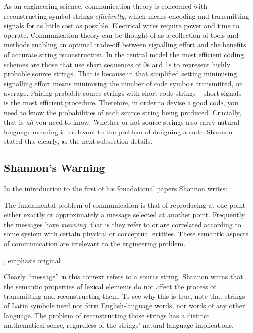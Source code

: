 \documentclass[12pt]{article}
\begin{document}
As an engineering science, communication theory is concerned with reconstructing symbol strings \textit{efficiently}, which means encoding and transmitting signals for as little cost as possible.
Electrical wires require power and time to operate.
Communication theory can be thought of as a collection of tools and methods enabling an optimal trade-off between signalling effort and the benefits of accurate string reconstruction.
In the central model the most efficient coding schemes are those that use short sequences of 0s and 1s to represent highly probable source strings.
That is because in that simplified setting minimising signalling effort means minimising the number of code symbols transmitted, on average.
Pairing probable source strings with short code strings -- short signals -- is the most efficient procedure.
Therefore, in order to devise a good code, you need to know the probabilities of each source string being produced.
Crucially, that is \textit{all} you need to know.
Whether or not source strings also carry natural language meaning is irrelevant to the problem of designing a code.
Shannon stated this clearly, as the next subsection details.


\subsection{Shannon's Warning}\label{subsec:warning}

In the introduction to the first of his foundational papers Shannon writes:

\begin{myquote}
The fundamental problem of communication is that of reproducing at one point either exactly or approximately a message selected at another point. Frequently the messages have \emph{meaning}; that is they refer to or are correlated according to some system with certain physical or conceptual entities. These semantic aspects of communication are irrelevant to the engineering problem.
\par\hspace*{\fill}\citet[379]{shannon1948mathematicalc}, emphasis original
\end{myquote}

\noindent Clearly ``message'' in this context refers to a source string.
Shannon warns that the semantic properties of lexical elements do not affect the process of transmitting and reconstructing them.
To see why this is true, note that strings of Latin symbols need not form English-language words, nor words of any other language.
The problem of reconstructing those strings has a distinct mathematical sense, regardless of the strings' natural language implications.
\end{document}

